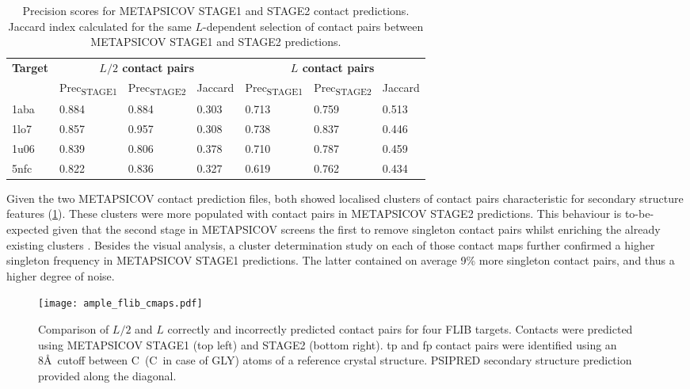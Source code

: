 \begin{table}[H]
  \centering
  \caption[Contact prediction summary for FLIB targets]{Precision scores for METAPSICOV \cite{Jones2015-vq} STAGE1 and STAGE2 contact predictions. Jaccard index calculated for the same $L$-dependent selection of contact pairs between METAPSICOV STAGE1 and STAGE2 predictions.}
  \label{table:ample_flib_contact_precision}
  \begin{tabularx}{\textwidth}{X X X X X X X}
      \hline
	  \multirow{2}{*}{\textbf{Target}} & \multicolumn{3}{c}{\textbf{$L/2$ contact pairs}} & \multicolumn{3}{c}{\textbf{$L$ contact pairs}} 	\\ \cline{2-7}
	  							&  	Prec\textsubscript{STAGE1}	& 	Prec\textsubscript{STAGE2}	& 	Jaccard 	& 	Prec\textsubscript{STAGE1} 	& 	Prec\textsubscript{STAGE2} 	& 	Jaccard	\\
	  \hline
	  1aba						&	0.884	&	0.884	&	0.303	&	0.713	&	0.759	&	0.513		\\
	  1lo7						&	0.857	&	0.957	&	0.308	&	0.738	&	0.837	&	0.446		\\
	  1u06						&	0.839	&	0.806	&	0.378	&	0.710	&	0.787	&	0.459		\\
	  5nfc						&	0.822	&	0.836	&	0.327	&	0.619	&	0.762	&	0.434		\\ 
	  \hline
  \end{tabularx}
\end{table}

Given the two METAPSICOV contact prediction files, both showed localised clusters of contact pairs characteristic for secondary structure features (\cref{fig:ample_flib_cmaps}). These clusters were more populated with contact pairs in METAPSICOV STAGE2 predictions. This behaviour is to-be-expected given that the second stage in METAPSICOV screens the first to remove singleton contact pairs whilst enriching the already existing clusters \cite{Jones2015-vq}. Besides the visual analysis, a cluster determination study on each of those contact maps further confirmed a higher singleton frequency in METAPSICOV STAGE1 predictions. The latter contained on average 9\% more singleton contact pairs, and thus a higher degree of noise.

\begin{figure}[H]
	\centering
	\texttt{[image: ample\_flib\_cmaps.pdf]}
        \caption[Contact map comparison for FLIB targets]{Comparison of $L/2$ and $L$ correctly and incorrectly predicted contact pairs for four FLIB targets. Contacts were predicted using METAPSICOV \cite{Jones2015-vq} STAGE1 (top left) and STAGE2 (bottom right). \Gls{tp} and \gls{fp} contact pairs were identified using an 8\AA\ cutoff between C\textalpha\ (C\textbeta\ in case of GLY) atoms of a reference crystal structure. PSIPRED \cite{Jones1999-ed} secondary structure prediction provided along the diagonal.}
	\label{fig:ample_flib_cmaps}
\end{figure}

